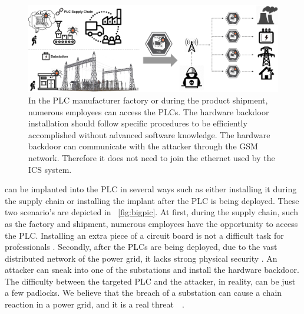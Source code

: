 \begin{figure}[tp!]
	\includegraphics[width=\textwidth]{figures/bigpic}
	\centering
	\caption{In the PLC manufacturer factory or during the product shipment, numerous employees can access the PLCs. The hardware backdoor installation should follow specific procedures to be efficiently accomplished without advanced software knowledge. The hardware backdoor can communicate with the attacker through the GSM network. Therefore it does not need to join the ethernet used by the ICS system.}
	\label{fig:bigpic}
\end{figure}

\name can be implanted into the PLC in several ways such as either installing it during the supply chain or installing the implant after the PLC is being deployed. These two scenario's are depicted in ~\autoref{fig:bigpic}. At first, during the supply chain, such as the factory and shipment, numerous employees have the opportunity to access the PLC. Installing an extra piece of a circuit board is not a difficult task for professionals \cite{harrison2021malicious, o2015special}. Secondly, after the PLCs are being deployed, due to the vast distributed network of the power grid, it lacks strong physical security \cite{Loopholes2020}. An attacker can sneak into one of the substations and install the hardware backdoor. The difficulty between the targeted PLC and the attacker, in reality, can be just a few padlocks. We believe that the breach of a substation can cause a chain reaction in a power grid, and it is a real threat~\cite{substationattack}~\cite{chen2020study}.




